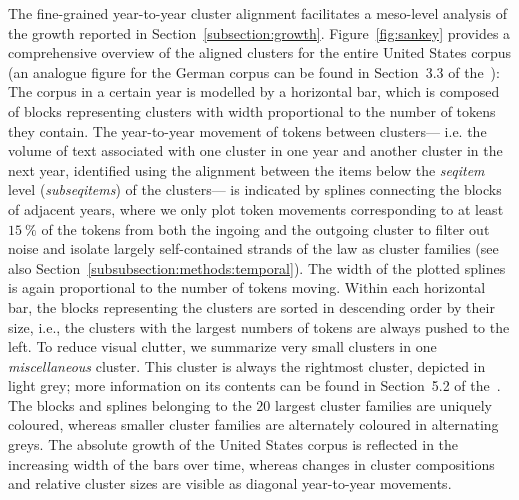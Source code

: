The fine-grained year-to-year cluster alignment facilitates a meso-level analysis of the growth reported in Section~\ref{subsection:growth}.
Figure~\ref{fig:sankey} provides a comprehensive overview of the aligned clusters for the entire United States corpus (an analogue figure for the German corpus can be found in Section~3.3 of the~\suppi): 
The corpus in a certain year is modelled by a horizontal bar, 
which is composed of blocks representing clusters with width proportional to the number of tokens they contain.
The year-to-year movement of tokens between clusters---%
i.e. the volume of text associated with one cluster in one year and another cluster in the next year, identified using the alignment between the items below the \emph{seqitem} level (\emph{subseqitems}) of the clusters---%
is indicated by splines connecting the blocks of adjacent years, 
where we only plot token movements corresponding to at least $15~\%$ of the tokens from both the ingoing and the outgoing cluster to filter out noise and isolate largely self-contained strands of the law as cluster families (see also Section~\ref{subsubsection:methods:temporal}).
The width of the plotted splines is again proportional to the number of tokens moving.
Within each horizontal bar, 
the blocks representing the clusters are sorted in descending order by their size, 
i.e., the clusters with the largest numbers of tokens are always pushed to the left.
To reduce visual clutter, we summarize very small clusters in one  \emph{miscellaneous} cluster. 
This cluster is always the rightmost cluster, depicted in light grey; 
more information on its contents can be found in Section~5.2 of the~\suppi. 
The blocks and splines belonging to the $20$ largest cluster families are uniquely coloured, 
whereas smaller cluster families are alternately coloured in alternating greys.
The absolute growth of the United States corpus is reflected in the increasing width of the bars over time, 
whereas changes in cluster compositions and relative cluster sizes are visible as diagonal year-to-year movements.  

